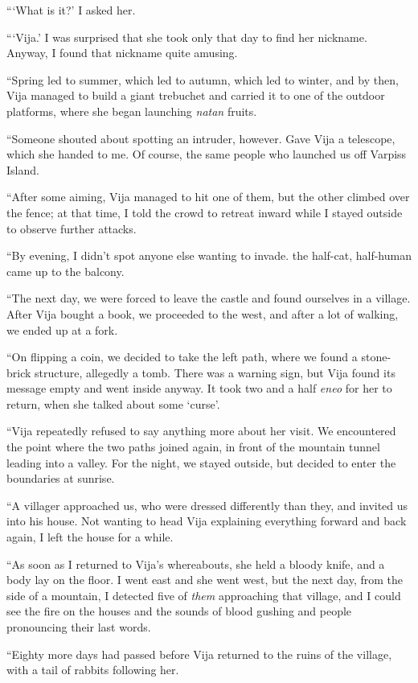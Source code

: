 ```What is it?' I asked her.

```Vija.' I was surprised that she took only that day to find her nickname. Anyway, I found that nickname quite amusing.

``Spring led to summer, which led to autumn, which led to winter, and by then, Vija managed to build a giant trebuchet and carried it to one of the outdoor platforms, where she began launching \emph{natan} fruits.

``Someone shouted about spotting an intruder, however. Gave Vija a telescope, which she handed to me. Of course, the same people who launched us off Varpiss Island.

``After some aiming, Vija managed to hit one of them, but the other climbed over the fence; at that time, I told the crowd to retreat inward while I stayed outside to observe further attacks.

``By evening, I didn't spot anyone else wanting to invade. \yronsyncra{} the half-cat, half-human came up to the balcony.

``The next day, we were forced to leave the castle and found ourselves in a village. After Vija bought a book, we proceeded to the west, and after a lot of walking, we ended up at a fork.

``On flipping a coin, we decided to take the left path, where we found a stone-brick structure, allegedly a tomb. There was a warning sign, but Vija found its message empty and went inside anyway. It took two and a half \emph{eneo} for her to return, when she talked about some `curse'.

``Vija repeatedly refused to say anything more about her visit. We encountered the point where the two paths joined again, in front of the mountain tunnel leading into a valley. For the night, we stayed outside, but decided to enter the boundaries at sunrise.

``A villager approached us, who were dressed differently than they, and invited us into his house. Not wanting to head Vija explaining everything forward and back again, I left the house for a while.

``As soon as I returned to Vija's whereabouts, she held a bloody knife, and a body lay on the floor. I went east and she went west, but the next day, from the side of a mountain, I detected five of \emph{them} approaching that village, and I could see the fire on the houses and the sounds of blood gushing and people pronouncing their last words.

``Eighty more days had passed before Vija returned to the ruins of the village, with a tail of rabbits following her.

